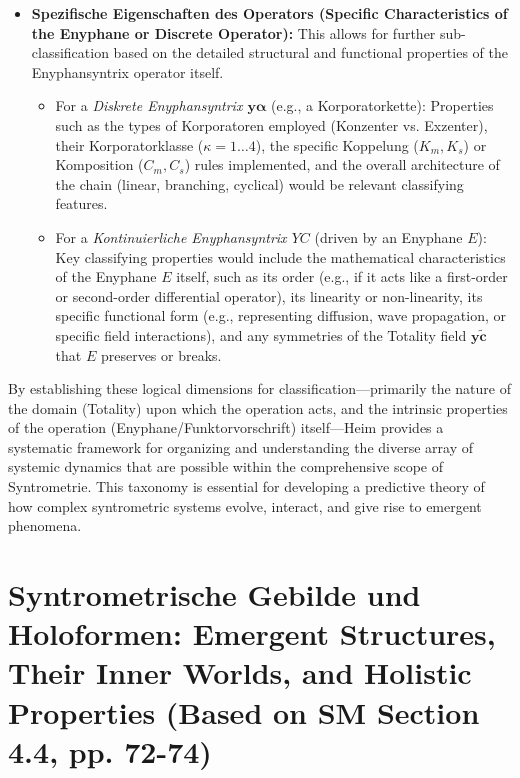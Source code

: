\documentclass[
    12pt,              %
    a4paper,           %
    headings=normal,   %
    twoside=true,      %
    BCOR=8mm,          %
]{scrbook}
\newcommand{\diskreteEnyphansyntrix}{\bm{y\alpha}}
\newcommand{\kontinuierlicheEnyphansyntrix}{YC}
\newcommand{\enyphane}{E}
\begin{document}
\begin{enumerate}[label=(\arabic*)]
\begin{itemize}
            \item   \textbf{Spezifische Eigenschaften des Operators (Specific Characteristics of the Enyphane or Discrete Operator):} This allows for further sub-classification based on the detailed structural and functional properties of the Enyphansyntrix operator itself.
                \begin{itemize}
                    \item   For a \textit{Diskrete Enyphansyntrix \(\diskreteEnyphansyntrix\)} (e.g., a Korporatorkette): Properties such as the types of Korporatoren employed (Konzenter vs. Exzenter), their Korporatorklasse (\(\kappa=1 \ldots 4\)), the specific Koppelung (\(K_m, K_s\)) or Komposition (\(C_m, C_s\)) rules implemented, and the overall architecture of the chain (linear, branching, cyclical) would be relevant classifying features.
                    \item   For a \textit{Kontinuierliche Enyphansyntrix \(\kontinuierlicheEnyphansyntrix\)} (driven by an Enyphane \(\enyphane\)): Key classifying properties would include the mathematical characteristics of the Enyphane \(\enyphane\) itself, such as its order (e.g., if it acts like a first-order or second-order differential operator), its linearity or non-linearity, its specific functional form (e.g., representing diffusion, wave propagation, or specific field interactions), and any symmetries of the Totality field \(\bm{y\widetilde{c}}\) that \(\enyphane\) preserves or breaks.
                \end{itemize}
        \end{itemize}
\end{enumerate}
By establishing these logical dimensions for classification—primarily the nature of the domain (Totality) upon which the operation acts, and the intrinsic properties of the operation (Enyphane/Funktorvorschrift) itself—Heim provides a systematic framework for organizing and understanding the diverse array of systemic dynamics that are possible within the comprehensive scope of Syntrometrie. This taxonomy is essential for developing a predictive theory of how complex syntrometric systems evolve, interact, and give rise to emergent phenomena.
\section{Syntrometrische Gebilde und Holoformen: Emergent Structures, Their Inner Worlds, and Holistic Properties (Based on SM Section 4.4, pp. 72-74)}
\label{sec:ch4_gebilde_holoformen_overall_revised} 
\end{document}
